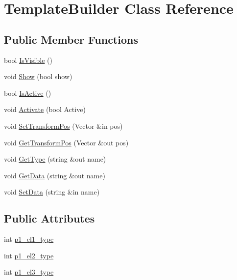 \hypertarget{class_template_builder}{}\section{Template\+Builder Class Reference}
\label{class_template_builder}
\subsection*{Public Member Functions}
\begin{DoxyCompactItemize}
\item 
bool \hyperlink{class_template_builder_a4dce883478f31bb85a99f770c50289e4}{Is\+Visible} ()
\item 
void \hyperlink{class_template_builder_a5857b6fad4674942cbc43812a381286a}{Show} (bool show)
\item 
bool \hyperlink{class_template_builder_ac1b03aa33802b1471f30695a92801631}{Is\+Active} ()
\item 
void \hyperlink{class_template_builder_a5407173fd0e3aedacfbf50b5fe8ee619}{Activate} (bool Active)
\item 
void \hyperlink{class_template_builder_abec2ea6ded5dc3bca9c5d6027986cc21}{Set\+Transform\+Pos} (Vector \&in pos)
\item 
void \hyperlink{class_template_builder_ae9aa871d5cf4a5d330babdc58a481b9d}{Get\+Transform\+Pos} (Vector \&out pos)
\item 
void \hyperlink{class_template_builder_a67bc9705aabf504327ddfc16c175bc85}{Get\+Type} (string \&out name)
\item 
void \hyperlink{class_template_builder_a9c05096ddb7f195343005cb82b722846}{Get\+Data} (string \&out name)
\item 
void \hyperlink{class_template_builder_a0cff5ae457e78989f061937237ae84d0}{Set\+Data} (string \&in name)
\end{DoxyCompactItemize}
\subsection*{Public Attributes}
\begin{DoxyCompactItemize}
\item 
int \hyperlink{class_template_builder_ae5a2033ac1a03e416a964d0a0c27ee5e}{p1\+\_\+el1\+\_\+type}
\item 
int \hyperlink{class_template_builder_ab95c7b1a998d72515ab4ebe55c26c705}{p1\+\_\+el2\+\_\+type}
\item 
int \hyperlink{class_template_builder_a2f118837472b08c373f968c5b383bb49}{p1\+\_\+el3\+\_\+type}
\end{DoxyCompactItemize}


